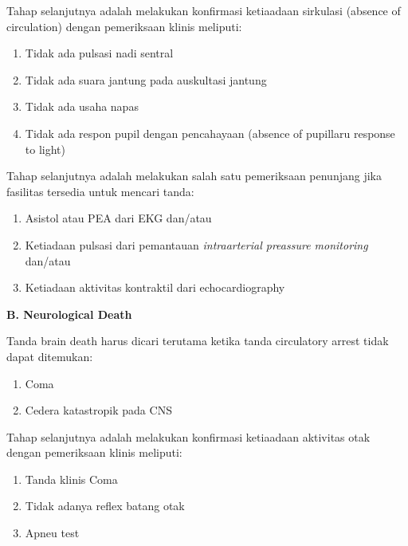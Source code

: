\documentclass[
]{book}
\begin{document}
Tahap selanjutnya adalah melakukan konfirmasi ketiaadaan sirkulasi (absence of circulation) dengan pemeriksaan klinis meliputi:

\begin{enumerate}
\def\labelenumi{\arabic{enumi}.}
\item
  Tidak ada pulsasi nadi sentral
\item
  Tidak ada suara jantung pada auskultasi jantung
\item
  Tidak ada usaha napas
\item
  Tidak ada respon pupil dengan pencahayaan (absence of pupillaru response to light)
\end{enumerate}

Tahap selanjutnya adalah melakukan salah satu pemeriksaan penunjang jika fasilitas tersedia untuk mencari tanda:

\begin{enumerate}
\def\labelenumi{\arabic{enumi}.}
\item
  Asistol atau PEA dari EKG dan/atau
\item
  Ketiadaan pulsasi dari pemantauan \emph{intraarterial preassure monitoring} dan/atau
\item
  Ketiadaan aktivitas kontraktil dari echocardiography
\end{enumerate}

\textbf{B. Neurological Death}

Tanda brain death harus dicari terutama ketika tanda circulatory arrest tidak dapat ditemukan:

\begin{enumerate}
\def\labelenumi{\arabic{enumi}.}
\item
  Coma
\item
  Cedera katastropik pada CNS
\end{enumerate}

Tahap selanjutnya adalah melakukan konfirmasi ketiaadaan aktivitas otak dengan pemeriksaan klinis meliputi:

\begin{enumerate}
\def\labelenumi{\arabic{enumi}.}
\item
  Tanda klinis Coma
\item
  Tidak adanya reflex batang otak
\item
  Apneu test
\end{enumerate}
\end{document}
